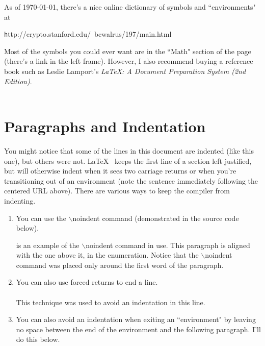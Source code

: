 \documentclass[12pt]{report} %
\begin{document}
As of \today, there's a nice online dictionary of symbols and ``environments" at 
\begin{center}
{\texttt http://crypto.stanford.edu/~bcwalrus/197/main.html}
\end{center}

Most of the symbols you could ever want are in the ``Math" section of the page 
(there's a link in the left frame).  However, I also recommend buying a reference 
book such as Leslie Lamport's {\it LaTeX: A Document Preparation System 
(2nd Edition)}.\\
~\\
\centerline{\shortstack{\rule{0.3\textwidth}{0.5 mm} \\ \rule{0.3\textwidth}{0.5 mm}}}

\setcounter{chapter}{2} 
\section{Paragraphs and Indentation}
\label{paragraphs}

You might notice that some of the lines in this document are indented (like this one), 
but others were not.  \LaTeX~ keeps the first line of a section left justified, but will 
otherwise  indent when it sees two carriage returns or when you're transitioning out 
of an environment (note the sentence immediately following the centered URL above).  
There are various ways to keep the compiler from indenting.  
	\begin{enumerate} %
	\item You can use the $\backslash$noindent command (demonstrated in the 
	source code below).  
	
	 is an example of the $\backslash$noindent command in use.  
	This paragraph is aligned with the one above it, in the enumeration.  Notice that 
	the $\backslash$noindent command was placed only around the first word of 
	the paragraph.
	
	\item You can also use forced returns to end a line.\\
	~\\
	This technique was used to avoid an indentation in this line.  
	
	\item You can also avoid an indentation when exiting an ``environment" by leaving 
	no space between the end of the environment and the following paragraph.  I'll do 
	this below.
	\end{enumerate} %
\end{document}
